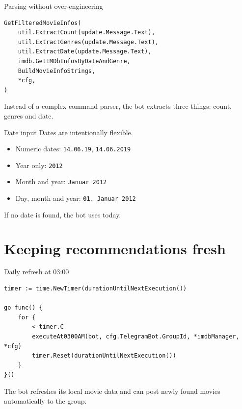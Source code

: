 \documentclass[aspectratio=169,10pt]{beamer}
\begin{document}
\begin{frame}[fragile]{Parsing without over-engineering}
\begin{lstlisting}
GetFilteredMovieInfos(
    util.ExtractCount(update.Message.Text),
    util.ExtractGenres(update.Message.Text),
    util.ExtractDate(update.Message.Text),
    imdb.GetIMDbInfosByDateAndGenre,
    BuildMovieInfoStrings,
    *cfg,
)
\end{lstlisting}

\vspace{0.25cm}
\normalsize
Instead of a complex command parser, the bot extracts three things:
count, genres and date.
\end{frame}

\begin{frame}{Date input}
  \Large
  Dates are intentionally flexible.

  \vspace{0.45cm}
  \normalsize
  \begin{itemize}
    \item Numeric dates: \texttt{14.06.19}, \texttt{14.06.2019}
    \item Year only: \texttt{2012}
    \item Month and year: \texttt{Januar 2012}
    \item Day, month and year: \texttt{01. Januar 2012}
  \end{itemize}

  \vspace{0.25cm}
  If no date is found, the bot uses today.
\end{frame}

\section{Keeping recommendations fresh}

\begin{frame}[fragile]{Daily refresh at 03:00}
\begin{lstlisting}
timer := time.NewTimer(durationUntilNextExecution())

go func() {
    for {
        <-timer.C
        executeAt0300AM(bot, cfg.TelegramBot.GroupId, *imdbManager, *cfg)
        timer.Reset(durationUntilNextExecution())
    }
}()
\end{lstlisting}

\vspace{0.25cm}
\normalsize
The bot refreshes its local movie data and can post newly found movies
automatically to the group.
\end{frame}
\end{document}
